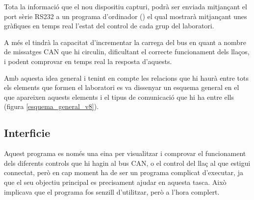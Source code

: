 Tota la informació que el nou dispositiu \Monitor capturi, podrà ser enviada mitjançant el port sèrie RS232 a un programa d'ordinador (\DCSMonitor) el qual mostrarà mitjançant unes gràfiques en temps real l'estat del control de cada grup del laboratori.

A més el \Monitor tindrà la capacitat d'incrementar la carrega del bus en quant a nombre de missatges CAN que hi circulin, dificultant el correcte funcionament dels llaços, i podent comprovar en temps real la resposta d'aquests.

Amb aquesta idea general i tenint en compte les relacions que hi haurà entre tots els elements que formen el laboratori es va dissenyar un esquema general en el que apareixen aquests elements i el tipus de comunicació que hi ha entre ells (figura \ref{esquema_general_v8}).

\begin{landscape}
\end{landscape}

\subsection{Interficie}\label{cap:dis:visual}

Aquest programa es només una eina per visualitzar i comprovar el funcionament dels diferents controls que hi hagin al bus CAN, o el control del llaç al que estigui connectat, però en cap moment ha de ser un programa complicat d'executar, ja que el seu objectiu principal es precisament ajudar en aquesta tasca. Això implicava que el programa fos senzill d'utilitzar, però a l'hora complert.

